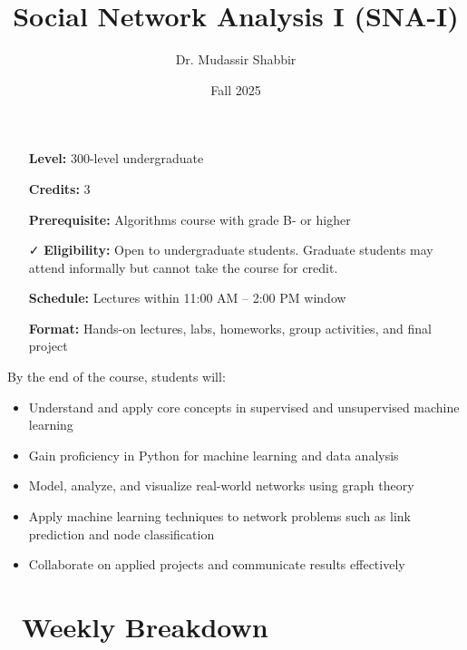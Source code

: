 \documentclass[11pt,a4paper]{article}
\title{Social Network Analysis I (SNA-I)}
\author{Dr. Mudassir Shabbir}
\date{Fall 2025}
\begin{document}
\maketitle

\begin{infobox}[title={\faInfo\ Course Overview}]
\begin{itemize}[leftmargin=0em]
  \item[\textcolor{secondary}{\faGraduationCap}] \textbf{Level:} 300-level undergraduate
  \item[\textcolor{secondary}{\faStar}] \textbf{Credits:} 3
  \item[\textcolor{warning}{\faExclamation}] \textbf{Prerequisite:} Algorithms course with grade B- or higher
  \item[\textcolor{success}{\faCheck}] \textbf{Eligibility:} Open to undergraduate students. Graduate students may attend informally but cannot take the course for credit.
  \item[\textcolor{secondary}{\faClock}] \textbf{Schedule:} Lectures within 11:00 AM -- 2:00 PM window
  \item[\textcolor{accent}{\faLaptop}] \textbf{Format:} Hands-on lectures, labs, homeworks, group activities, and final project
\end{itemize}
\end{infobox}

\vspace{1em}

\begin{objectivebox}[title={\faBullseye\ Learning Objectives}]
By the end of the course, students will:
\begin{itemize}
  \item Understand and apply core concepts in supervised and unsupervised machine learning
  \item Gain proficiency in Python for machine learning and data analysis
  \item Model, analyze, and visualize real-world networks using graph theory
  \item Apply machine learning techniques to network problems such as link prediction and node classification
  \item Collaborate on applied projects and communicate results effectively
\end{itemize}
\end{objectivebox}

\section*{\faCalendar\ Weekly Breakdown}
\end{document}
